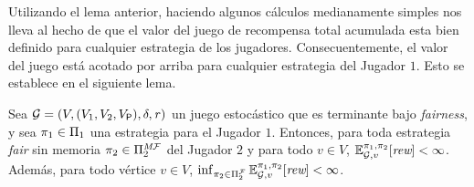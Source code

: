 



Utilizando el lema anterior, haciendo algunos cálculos medianamente simples nos lleva al hecho de que el valor del juego de recompensa total acumulada esta bien definido para cualquier estrategia de los jugadores.
%
Consecuentemente, el valor del juego está acotado por arriba para cualquier estrategia del Jugador $1$.
%
Esto se establece en el siguiente lema.

\begin{lemma}\label{lm:memoryless-strat-p2-bounded-expectation}
  Sea $\mathcal{G}= (V, (V_1, V_2, V_{\mathsf{P}}), \delta, \mathit{r})$ un
  juego estocástico que es terminante bajo \textit{fairness}, y sea
  $\pi_{1} \in \Pi_{1}$ una estrategia para el Jugador $1$.
  Entonces, para toda estrategia \textit{fair} sin memoria
  $\pi_{2} \in \Pi^{\textit{M}\mathcal{F}}_{2}$ del Jugador $2$
  y para todo $v \in V$,
  $\mathbb{E}^{\pi_{1}, \pi_{2}}_{\mathcal{G},v}[\textit{rew}] < \infty$.
  Además, para todo vértice $v \in V$,
  $\inf_{\pi_{2} \in \Pi^{\mathcal{F}}_{2}} \mathbb{E}^{\pi_{1}, \pi_{2}}_{\mathcal{G},v}[\textit{rew}] < \infty$.
\end{lemma}


